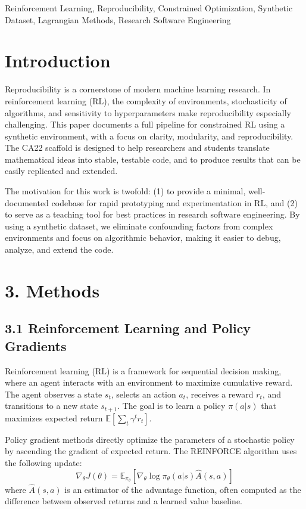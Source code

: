 \documentclass[conference]{IEEEtran}
\begin{document}
\begin{IEEEkeywords}
Reinforcement Learning, Reproducibility, Constrained Optimization, Synthetic Dataset, Lagrangian Methods, Research Software Engineering
\end{IEEEkeywords}

\section{Introduction}
Reproducibility is a cornerstone of modern machine learning research. In reinforcement learning (RL), the complexity of environments, stochasticity of algorithms, and sensitivity to hyperparameters make reproducibility especially challenging. This paper documents a full pipeline for constrained RL using a synthetic environment, with a focus on clarity, modularity, and reproducibility. The CA22 scaffold is designed to help researchers and students translate mathematical ideas into stable, testable code, and to produce results that can be easily replicated and extended.

The motivation for this work is twofold: (1) to provide a minimal, well-documented codebase for rapid prototyping and experimentation in RL, and (2) to serve as a teaching tool for best practices in research software engineering. By using a synthetic dataset, we eliminate confounding factors from complex environments and focus on algorithmic behavior, making it easier to debug, analyze, and extend the code.

\section*{3. Methods}
\subsection*{3.1 Reinforcement Learning and Policy Gradients}
Reinforcement learning (RL) is a framework for sequential decision making, where an agent interacts with an environment to maximize cumulative reward. The agent observes a state $s_t$, selects an action $a_t$, receives a reward $r_t$, and transitions to a new state $s_{t+1}$. The goal is to learn a policy $\pi(a|s)$ that maximizes expected return $\mathbb{E}[\sum_t \gamma^t r_t]$.

Policy gradient methods directly optimize the parameters of a stochastic policy by ascending the gradient of expected return. The REINFORCE algorithm uses the following update:
\begin{equation}
\nabla_\theta J(\theta) = \mathbb{E}_{\pi_\theta} [\nabla_\theta \log \pi_\theta(a|s) \hat{A}(s,a)]
\end{equation}
where $\hat{A}(s,a)$ is an estimator of the advantage function, often computed as the difference between observed returns and a learned value baseline.
\end{document}
